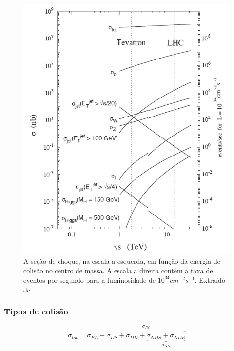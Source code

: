 \begin{figure}[h!t]
\centering
\includegraphics[width=.7\textwidth]{imagens/Lum_cross.png}
\caption[A seção de choque em função da energia de colisão no centro de massa]{
A seção de choque, na escala a esquerda, em função da energia de colisão no
centro de massa. A escala a direita contêm a taxa de eventos por segundo 
para a luminosidade de $10^{34}cm^{-2}s^{-1}$. 
Extraído de \cite{ATLAS_HLT_DAQ}.}
\label{fig:lum_cross}
\end{figure}


\subsubsection{Tipos de colisão}
\label{sssec:tipos_col}


\begin{equation}
\sigma_{tot} =  \sigma_{EL} + \overbrace{\sigma_{DS} + \sigma_{DD} +
\underbrace{\sigma_{NDS}+\sigma_{NDR}}_{\sigma_{ND}}}^{\sigma_{IN}}
\label{eq:secao_choque}
\end{equation}


